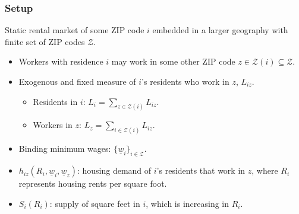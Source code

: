 \documentclass[aspectratio=169, t]{beamer}
\newcommand{\Z}{\mathcal{Z}}
\newcommand{\MW}{\underline{w}}
\begin{document}
\begin{frame}
    \frametitle{Setup}
    
    Static rental market of some ZIP code $i$ embedded in a larger geography with finite
    set of ZIP codes $\Z$.    
    \begin{itemize}
        \vspace{2mm}
        \item Workers with residence $i$ may work in some other ZIP code $z\in\Z(i)\subseteq\Z$.

        \pause
        \vspace{2mm}
        \item Exogenous and fixed measure of $i$'s residents who work in $z$, $L_{iz}$.
        \begin{itemize}
            \item Residents in $i$: $L_i = \sum_{z \in \Z(i)} L_{iz}$.
            \item Workers in $z$: $L_z = \sum_{i \in \Z(i)} L_{iz}$.
        \end{itemize}
    
        \pause
        \vspace{2mm}
        \item Binding minimum wages: $\{\MW_i\}_{i\in\Z}$.
        
        \pause
        \vspace{2mm}
        \item $h_{i z} (R_i, \MW_i, \MW_z)$: housing demand of $i$'s residents that work in $z$, where $R_i$ 
        represents housing rents per square foot.

        \pause
        \vspace{2mm}
        \item $S_i \left(R_i \right)$: supply of square feet in $i$, which is increasing in $R_i$.

    \end{itemize}
\end{frame}
\end{document}
